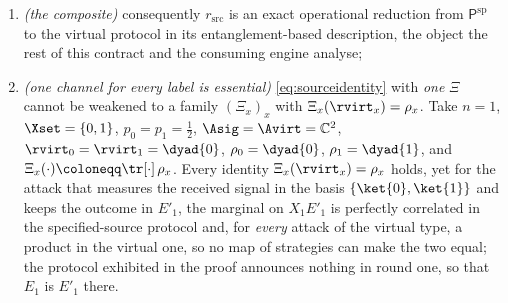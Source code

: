 \begin{lemma}
\begin{enumerate}[label=(\roman*),leftmargin=3.0em]
  systems $A_1,\dots,A_n$ carry, jointly with the virtual transmitted systems,
  the preparation $\Psi^{\otimes n}$, where $\Psi$ is a source-replacement
  certificate for the  $(A,\mathbb{T},\tau_A,\{M_x\})$
  against $\{p_x,\rvirt_x\}$ in any of the declared forms of
  , satisfying (SR1)--(SR3); and $x_j$ is
  produced by her declared  $\pcNmsm$, the
  measurement map of part (iii) of , applied to
  $A_j$ at its declared time in round $j$. Write $\mathsf{out}^{\mathrm{eb}}$
  for the resulting output map on the virtual type. Then, under A-SEQ
  (),
  $\mathsf{out}^{\mathrm{eb}}(a)=\mathsf{out}^{\mathrm{v}}(a)$ for every
  strategy $a$ of that type, so the identity map on strategies is an exact
  operational reduction between the two presentations in either direction;
\item \emph{(the composite)} consequently $r_{\mathrm{src}}$ is an exact
  operational reduction from $\mathsf{P}^{\mathrm{sp}}$ to the virtual protocol
  in its entanglement-based description, the object the rest of this
  contract and the consuming engine analyse;
\item \emph{(one channel for every label is essential)} \eqref{eq:sourceidentity}
  with \emph{one} $\Xi$ cannot be weakened to a family $(\Xi_x)_x$ with
  $\Xi_x(\rvirt_x)=\rho_x$. Take $n=1$, $\Xset=\{0,1\}$,
  $p_0=p_1=\tfrac12$, $\Asig=\Avirt=\mathbb{C}^{2}$,
  $\rvirt_0=\rvirt_1=\dyad{0}$, $\rho_0=\dyad{0}$, $\rho_1=\dyad{1}$, and
  $\Xi_x(\cdot)\coloneqq\tr[\cdot]\,\rho_x$. Every identity
  $\Xi_x(\rvirt_x)=\rho_x$ holds, yet for the attack that measures the received
  signal in the basis $\{\ket{0},\ket{1}\}$ and keeps the outcome in $E'_1$,
  the marginal on $X_1E'_1$ is perfectly correlated in the specified-source
  protocol and, for \emph{every} attack of the virtual type, a product in the
  virtual one, so no map of strategies can make the two
   equal; the protocol exhibited in the proof announces nothing in round one, so that
  $E_1$ is $E'_1$ there.
\end{enumerate}
\end{lemma}

